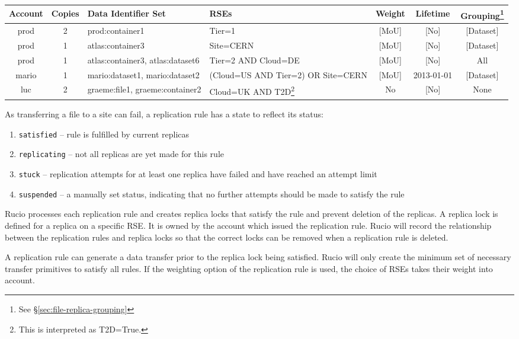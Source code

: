 \documentclass{atlasnote}
\begin{document}
\begin{minipage}{12cm}
\begin{tabular}{c c p{3cm} p{2cm} c c c}
\toprule
\textbf{Account} & \textbf{Copies} & \textbf{Data Identifier Set} & \textbf{RSEs} & \textbf{Weight} & \textbf{Lifetime} & \textbf{Grouping\footnote{See \S \ref{sec:file-replica-grouping} }} \\
\midrule
prod & 2 & prod:container1 & Tier=1 & [MoU] & [No] & [Dataset] \\
prod & 1 & atlas:container3 & Site=CERN & [MoU] & [No] & [Dataset] \\
prod & 1 & atlas:container3, atlas:dataset6 & Tier=2 AND Cloud=DE & [MoU] & [No] & All \\
mario & 1 & mario:dataset1, mario:dataset2 & (Cloud=US AND Tier=2) OR Site=CERN & [MoU] & 2013-01-01 & [Dataset] \\
luc & 2 & graeme:file1, graeme:container2 & Cloud=UK AND T2D\footnote{This is interpreted as T2D=True.} & No & [No] & None \\
\bottomrule
\end{tabular}
\end{minipage}

As transferring a file to a site can fail, a replication rule has a state to reflect its status:

\begin{enumerate}
\item[] \texttt{satisfied} -- rule is fulfilled by current replicas
\item[] \texttt{replicating} -- not all replicas are yet made for this rule
\item[] \texttt{stuck} -- replication attempts for at least one replica have failed and have reached an attempt limit
\item[] \texttt{suspended} -- a manually set status, indicating that no further attempts should be made to satisfy the rule
\end{enumerate}

Rucio processes each replication rule and creates replica locks that satisfy the rule and prevent deletion of the replicas. A replica lock is defined for a replica on a specific RSE. It is owned by the account which issued the replication rule. Rucio will record the relationship between the replication rules and replica locks so that the correct locks can be removed when a replication rule is deleted.

A replication rule can generate a data transfer prior to the replica lock being satisfied. Rucio will only create the minimum set of necessary transfer primitives to satisfy all rules. If the weighting option of the replication rule is used, the choice of RSEs takes their weight into account.
\end{document}
